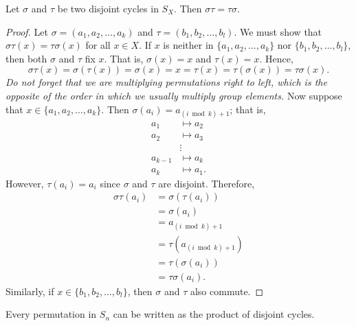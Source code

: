  
\begin{proposition}
Let $\sigma$ and $\tau$ be two disjoint cycles in $S_X$. Then $\sigma
\tau = \tau \sigma$. 
\end{proposition}

 
\begin{proof} 
Let $\sigma = (a_1, a_2, \ldots, a_k )$ and $\tau = (b_1, b_2, \ldots,
b_l )$. We must show that $\sigma \tau(x) = \tau \sigma(x)$ for all $x
\in X$. If $x$ is neither in $\{ a_1, a_2, \ldots, a_k \}$ nor $\{b_1,
b_2, \ldots, b_l  \}$, then both $\sigma$ and $\tau$ fix $x$. That is,
$\sigma(x)=x$ and $\tau(x)=x$. Hence, 
\[
\sigma \tau(x) = \sigma( \tau(x)) = \sigma(x) = x = \tau(x)
= \tau( \sigma(x)) =  \tau \sigma(x).
\]
{\em Do not forget that we are multiplying permutations right to left,
which is the opposite of the order in which we usually multiply group
elements.}  Now suppose that $x \in \{ a_1, a_2, \ldots, a_k \}$. Then 
$\sigma( a_i ) = a_{(i \bmod k) + 1}$; that is, 
\begin{align*}
a_1 & \mapsto  a_2 \\
a_2 & \mapsto  a_3 \\
& \vdots  \\
a_{k-1} & \mapsto  a_k \\
a_k & \mapsto  a_1.
\end{align*}
However, $\tau(a_i) = a_i$ since $\sigma$ and $\tau$ are disjoint.
Therefore, 
\begin{align*}
\sigma \tau(a_i) & = \sigma( \tau(a_i)) \\
& = \sigma(a_i) \\ 
& = a_{(i \bmod k)+1} \\
& = \tau( a_{(i \bmod k)+1} ) \\
& = \tau( \sigma(a_i) ) \\
& = \tau \sigma(a_i).
\end{align*}
Similarly, if $x \in \{b_1, b_2, \ldots, b_l  \}$, then $\sigma$ and
$\tau$ also commute. 
\end{proof}
 
\begin{theorem}
Every permutation in $S_n$ can be written as the product of disjoint
cycles. 
\end{theorem}
 
 
 
